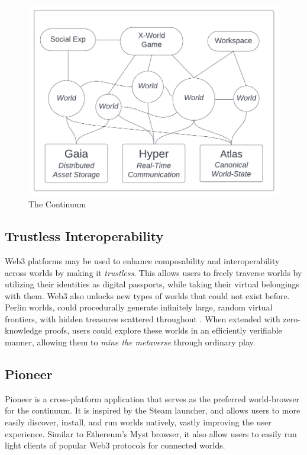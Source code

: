 \documentclass[twocolumn, 10pt]{article}
\begin{document}
\begin{figure}
    \centering
    \includegraphics{images/continuum.png}
    \caption{The Continuum}
    \label{fig:my_label}
\end{figure}

\subsection{Trustless Interoperability}

Web3 platforms may be used to enhance composability and interoperability across worlds by making it \textit{trustless}. This allows users to freely traverse worlds by utilizing their identities as digital passports, while taking their virtual belongings with them. Web3 also unlocks new types of worlds that could not exist before. Perlin worlds, could procedurally generate infinitely large, random virtual frontiers, with hidden treasures scattered throughout \cite{perlin1985image}. When extended with zero-knowledge proofs, users could explore these worlds in an efficiently verifiable manner, allowing them to \textit{mine the metaverse} through ordinary play.

\subsection{Pioneer}

Pioneer is a cross-platform application that serves as the preferred world-browser for the continuum. It is inspired by the Steam launcher, and allows users to more easily discover, install, and run worlds natively, vastly improving the user experience. Similar to Ethereum’s Myst browser, it also allow users to easily run light clients of popular Web3 protocols for connected worlds.
\end{document}

